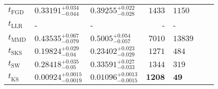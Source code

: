 \begin{tabular}{l|llr|llr}
	\midrule
	$t_{\mathrm{FGD}}$ & $0.33191_{-0.044}^{+0.034}$ & $0.39255_{-0.028}^{+0.022}$ & $1433$ & $1150$ \\
	$t_{\mathrm{LLR}}$ & - & - & - & - \\
	$t_{\mathrm{MMD}}$ & $0.43535_{-0.079}^{+0.067}$ & $0.5005_{-0.057}^{+0.054}$ & $7010$ & $13839$ \\
	$t_{\mathrm{SKS}}$ & $0.19824_{-0.04}^{+0.029}$ & $0.23402_{-0.029}^{+0.023}$ & $1271$ & $484$ \\
	$t_{\mathrm{SW}}$ & $0.28418_{-0.05}^{+0.035}$ & $0.33591_{-0.033}^{+0.027}$ & $1344$ & $319$ \\
	$t_{\overline{\mathrm{KS}}}$ & ${\mathbf{0.00924_{-0.0019}^{+0.0015}}}$ & ${\mathbf{0.01096_{-0.0015}^{+0.0013}}}$ & ${\mathbf{1208}}$ & ${\mathbf{49}}$ \\
	\bottomrule
\end{tabular}